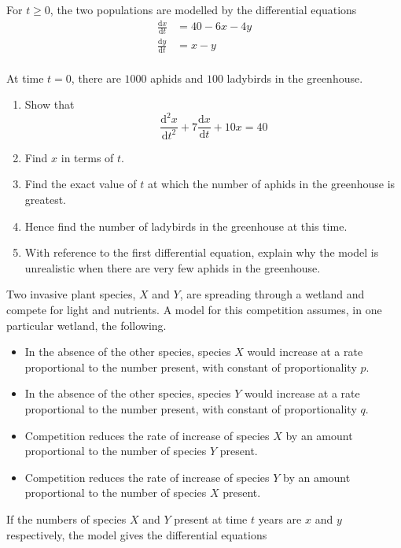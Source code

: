 \documentclass[leqno]{article}
\begin{document}
\begin{enumerate}[
  label=\textbf{\arabic*.},
  leftmargin=*,
  topsep=0pt,
  partopsep=0pt,
  parsep=0pt
]
For $t \ge 0$, the two populations are modelled by the differential equations
\[
\begin{aligned}
\frac{\mathrm{d}x}{\mathrm{d}t} &= 40 - 6x - 4y \\
\frac{\mathrm{d}y}{\mathrm{d}t} &= x - y
\end{aligned}
\] \\
At time $t = 0$, there are $1000$ aphids and $100$ ladybirds in the greenhouse. \\
\begin{enumerate}[label=\textbf{(\alph*)}]
  \item Show that
  \[\frac{\mathrm{d}^2x}{\mathrm{d}t^2} + 7\frac{\mathrm{d}x}{\mathrm{d}t} + 10x = 40\] 
  \item Find $x$ in terms of $t$.  \\
  \item Find the exact value of $t$ at which the number of aphids in the greenhouse is greatest.  \\
  \item Hence find the number of ladybirds in the greenhouse at this time.  \\
  \item With reference to the first differential equation, explain why the model is unrealistic when there are very few aphids in the greenhouse.  \\
\end{enumerate}

\newpage

\questionitem

Two invasive plant species, $X$ and $Y$, are spreading through a wetland and compete for light and nutrients. A model for this competition assumes, in one particular wetland, the following. \\
\begin{itemize}
  \item In the absence of the other species, species $X$ would increase at a rate proportional to the number present, with constant of proportionality $p$.
  \item In the absence of the other species, species $Y$ would increase at a rate proportional to the number present, with constant of proportionality $q$.
  \item Competition reduces the rate of increase of species $X$ by an amount proportional to the number of species $Y$ present.
  \item Competition reduces the rate of increase of species $Y$ by an amount proportional to the number of species $X$ present. \\
\end{itemize}
If the numbers of species $X$ and $Y$ present at time $t$ years are $x$ and $y$ respectively, the model gives the differential equations 


\end{enumerate}
\end{document}
